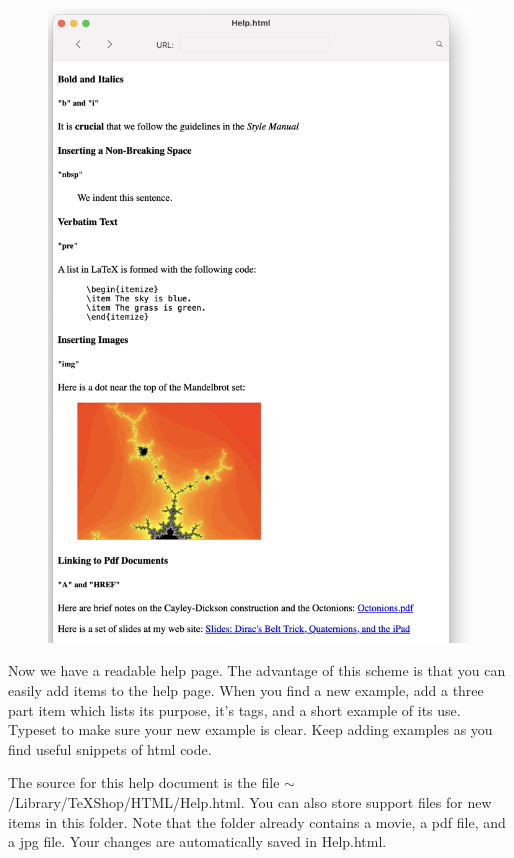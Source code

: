 \documentclass[11pt, oneside]{article}   	%
\begin{document}
\begin{figure}[H] %
     \hspace{.2in}  \includegraphics[width=6in.]{Graphics/shot15.png} %
\end{figure}
\newpage

Now we have a readable help page. The advantage of this scheme is that you can easily add items to the help page. When you find a new example, add a three part item which lists its purpose, it's tags, and a short example of its use. Typeset to make sure your new example is clear. Keep adding examples as you find useful snippets of html code.

The source for this help document is the file $\sim$/Library/TeXShop/HTML/Help.html. You can also store support files for new items in this folder. Note that the folder already contains a movie, a pdf file, and a jpg file.
Your changes are automatically saved in Help.html.
\end{document}
